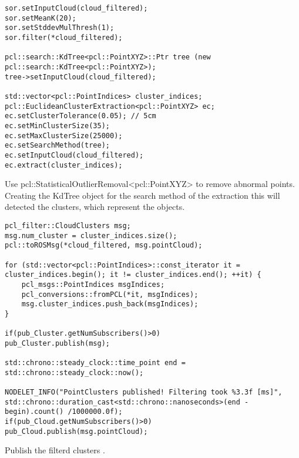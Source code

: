 \begin{lstlisting}[caption={}]
sor.setInputCloud(cloud_filtered);
sor.setMeanK(20);
sor.setStddevMulThresh(1);
sor.filter(*cloud_filtered);

pcl::search::KdTree<pcl::PointXYZ>::Ptr tree (new pcl::search::KdTree<pcl::PointXYZ>);
tree->setInputCloud(cloud_filtered);

std::vector<pcl::PointIndices> cluster_indices;
pcl::EuclideanClusterExtraction<pcl::PointXYZ> ec;
ec.setClusterTolerance(0.05); // 5cm
ec.setMinClusterSize(35);
ec.setMaxClusterSize(25000);
ec.setSearchMethod(tree);
ec.setInputCloud(cloud_filtered);
ec.extract(cluster_indices);
\end{lstlisting}


Use pcl::StatisticalOutlierRemoval<pcl::PointXYZ> to remove abnormal points.\\
Creating the KdTree object for the search method of the extraction this will detected the clusters, which represent the objects.
\begin{lstlisting}[caption={}]
pcl_filter::CloudClusters msg;
msg.num_cluster = cluster_indices.size();
pcl::toROSMsg(*cloud_filtered, msg.pointCloud);

for (std::vector<pcl::PointIndices>::const_iterator it = cluster_indices.begin(); it != cluster_indices.end(); ++it) {
	pcl_msgs::PointIndices msgIndices;
	pcl_conversions::fromPCL(*it, msgIndices);
	msg.cluster_indices.push_back(msgIndices);
}

if(pub_Cluster.getNumSubscribers()>0)
pub_Cluster.publish(msg);

std::chrono::steady_clock::time_point end = std::chrono::steady_clock::now();

NODELET_INFO("PointClusters published! Filtering took %3.3f [ms]", std::chrono::duration_cast<std::chrono::nanoseconds>(end - begin).count() /1000000.0f);
if(pub_Cloud.getNumSubscribers()>0)
pub_Cloud.publish(msg.pointCloud);
\end{lstlisting}
Publish the filterd clusters .\\






